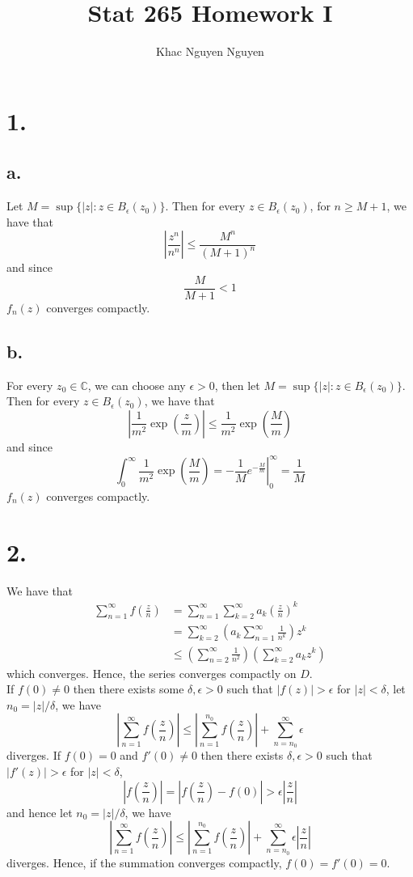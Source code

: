 \documentclass[11pt]{article}
\title{\textbf{Stat 265 Homework I}}
\author{Khac Nguyen Nguyen}
\date{}
\begin{document}
\section*{1.}
\subsection*{a.}
Let $M = \sup\{|z|: z \in B_\epsilon(z_0)\}$. Then for every $z \in B_\epsilon(z_0)$, for $n\ge M+1$, we have that  
\[
    \left|\frac{z^n}{n^n} \right| \le \frac{M^n}{(M+1)^n}
\]
and since
\[
    \frac{M}{M+1} < 1    
\]
$f_n(z)$ converges compactly.
\subsection*{b.}
For every $z_0 \in \mathbb{C}$, we can choose any $\epsilon >0$, then let $M = \sup\{|z|: z \in B_\epsilon(z_0)\}$. Then for every $z \in B_\epsilon(z_0)$, we have that  
\[
    \left|\frac{1}{m^2} \exp\left(\frac{z}{m} \right) \right| \le \frac{1}{m^2} \exp\left(\frac{M}{m} \right) 
\]
and since
\[
    \int_0^\infty \frac{1}{m^2} \exp\left( \frac{M}{m} \right) = \left.-\frac{1}{M}e^{-\frac{M}{m}} \right|_0^\infty = \frac{1}{M}
\]
$f_n(z)$ converges compactly.
\newpage
\section*{2.}
We have that 
\begin{equation*}
    \begin{aligned}
        \sum_{n=1}^\infty f\left(\frac{z}{n} \right) &= \sum_{n=1}^\infty \sum_{k=2}^\infty a_k \left( \frac{z}{n}\right)^k \\
        &= \sum_{k=2}^\infty \left(a_k \sum_{n=1}^\infty \frac{1}{n^k}\right)  z^k \\
        &\le \left(\sum_{n=2}^\infty \frac{1}{n^2}\right)\left(\sum_{k=2}^\infty a_k   z^k\right)
    \end{aligned}
\end{equation*}
which converges. Hence, the series converges compactly on $D$. \\
If $f(0) \ne 0$ then there exists some $\delta, \epsilon > 0$ such that $|f(z)| > \epsilon$ for $|z|<\delta$, let $n_0 = |z|/\delta$, we have 
\[
    \left|\sum_{n=1}^\infty f\left(\frac{z}{n}\right)\right| \le  \left|\sum_{n=1}^{n_0} f\left(\frac{z}{n} \right) \right| + \sum_{n=n_0}^{\infty} \epsilon
\]
diverges. If $f(0) = 0$ and $f'(0) \ne 0$ then there exists $\delta, \epsilon >0$ such that $|f'(z)| > \epsilon$ for $|z|< \delta$,  
\[
    \left|f\left(\frac{z}{n}\right)\right| = \left|f\left(\frac{z}{n}\right)-f(0)\right| > \epsilon \left|\frac{z}{n}\right|    
\]
and hence let $n_0 = |z|/\delta$, we have 
\[
    \left|\sum_{n=1}^\infty f\left(\frac{z}{n}\right)\right| \le \left| \sum_{n=1}^{n_0} f\left(\frac{z}{n} \right)\right| + \sum_{n=n_0}^\infty \epsilon \left|\frac{z}{n}\right| 
\]
diverges. Hence, if the summation converges compactly, $f(0) = f'(0) = 0$.
\newpage
\end{document}
